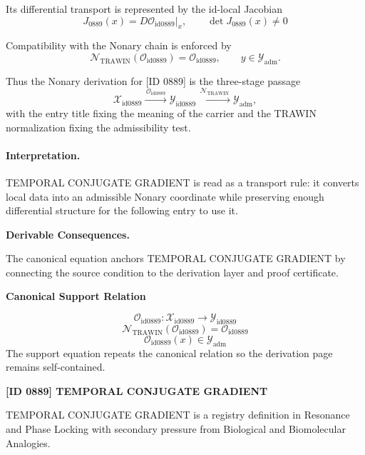 Its differential transport is represented by the id-local Jacobian\[
J_{0889}(x)=D\mathcal{O}_{\mathrm{id0889}}\big|_x,\qquad \det J_{0889}(x)\neq 0
\]

Compatibility with the Nonary chain is enforced by\[
\mathcal{N}_{\mathrm{TRAWIN}}(\mathcal{O}_{\mathrm{id0889}})=\mathcal{O}_{\mathrm{id0889}},\qquad y\in\mathcal{Y}_{\mathrm{adm}}.
\]

Thus the Nonary derivation for [ID 0889] is the three-stage passage
\[
\mathcal{X}_{\mathrm{id0889}}\xrightarrow{\,\mathcal{O}_{\mathrm{id0889}}\,} \mathcal{Y}_{\mathrm{id0889}}\xrightarrow{\,\mathcal{N}_{\mathrm{TRAWIN}}\,} \mathcal{Y}_{\mathrm{adm}},
\]
with the entry title fixing the meaning of the carrier and the TRAWIN normalization fixing the admissibility test.

\paragraph{Interpretation.} TEMPORAL CONJUGATE GRADIENT is read as a transport rule: it converts local data into an admissible Nonary coordinate while preserving enough differential structure for the following entry to use it.

\par\vspace{0.35em}
\noindent\textbf{Derivable Consequences.}\quad
\begingroup
\footnotesize
\raggedright
The canonical equation anchors TEMPORAL CONJUGATE GRADIENT by connecting the source condition to the derivation layer and proof certificate.
\par\endgroup

\noindent\textbf{Canonical Support Relation}\par
\[
\mathcal{O}_{\mathrm{id0889}}:\mathcal{X}_{\mathrm{id0889}}\longrightarrow\mathcal{Y}_{\mathrm{id0889}}
\]
\[
\mathcal{N}_{\mathrm{TRAWIN}}(\mathcal{O}_{\mathrm{id0889}})=\mathcal{O}_{\mathrm{id0889}}
\]
\[
\mathcal{O}_{\mathrm{id0889}}(x)\in\mathcal{Y}_{\mathrm{adm}}
\]
\noindent The support equation repeats the canonical relation so the derivation page remains self-contained.\par

\clearpage
\noindent\textbf{[ID 0889] TEMPORAL CONJUGATE GRADIENT}\par
\vspace{0.35em}
\begingroup\small
{}
TEMPORAL CONJUGATE GRADIENT is a registry definition in Resonance and Phase Locking with secondary pressure from Biological and Biomolecular Analogies.

